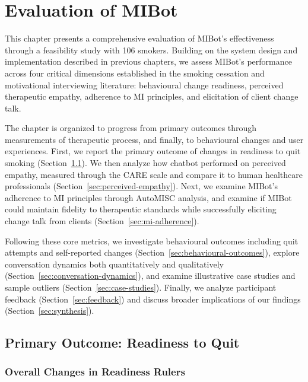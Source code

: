\chapter{Evaluation of MIBot}
\label{ch:mibot-eval}

This chapter presents a comprehensive evaluation of MIBot's effectiveness through a feasibility study with 106 smokers. Building on the system design and implementation described in previous chapters, we assess MIBot's performance across four critical dimensions established in the smoking cessation and motivational interviewing literature: behavioural change readiness, perceived therapeutic empathy, adherence to MI principles, and elicitation of client change talk.

The chapter is organized to progress from primary outcomes through measurements of therapeutic process, and finally, to behavioural changes and user experiences. First, we report the primary outcome of changes in readiness to quit smoking (Section~\ref{sec:primary-outcome}). We then analyze how chatbot performed on perceived empathy, measured through the CARE scale and compare it to human healthcare professionals (Section~\ref{sec:perceived-empathy}). Next, we examine MIBot's adherence to MI principles through AutoMISC analysis, and examine if MIBot could maintain fidelity to therapeutic standards while successfully eliciting change talk from clients (Section~\ref{sec:mi-adherence}).

Following these core metrics, we investigate behavioural outcomes including quit attempts and self-reported changes (Section~\ref{sec:behavioural-outcomes}), explore conversation dynamics both quantitatively and qualitatively (Section~\ref{sec:conversation-dynamics}), and examine illustrative case studies and sample outliers (Section~\ref{sec:case-studies}). Finally, we analyze participant feedback (Section~\ref{sec:feedback}) and discuss broader implications of our findings (Section~\ref{sec:synthesis}).

\section{Primary Outcome: Readiness to Quit}
\label{sec:primary-outcome}

\subsection{Overall Changes in Readiness Rulers}

